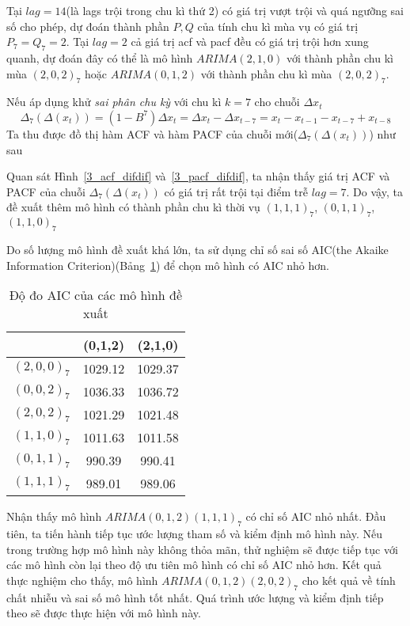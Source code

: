 Tại $lag =14$(là lags trội trong chu kì thứ 2) có giá trị vượt trội và quá ngưỡng sai số cho phép, dự đoán thành phần $P, Q$ của tính chu kì mùa vụ có giá trị  $P_7=Q_7=2$. Tại $lag = 2$ cả giá trị acf và pacf đều có giá trị trội hơn xung quanh, dự đoán đây có thể là mô hình $ARIMA(2,1,0)$ với thành phần chu kì mùa $(2,0,2)_7$ hoặc $ARIMA(0,1,2)$ với thành phần chu kì mùa $(2,0,2)_7$. 

Nếu áp dụng khử \textit{sai phân chu kỳ} với chu kì $k=7$ cho chuỗi $\Delta{x_t}$
\begin{equation}
 \Delta_7(\Delta(x_t)) = (1-B^7)\Delta{x_t} = \Delta{x_t}-\Delta{x_{t-7}} = x_t-x_{t-1} - x_{t-7}+x_{t-8}
\end{equation}
Ta thu được đồ thị hàm ACF và hàm PACF của chuỗi mới($\Delta_7(\Delta(x_t))$) như sau

Quan sát Hình~\ref{3_acf_difdif} và~\ref{3_pacf_difdif}, ta nhận thấy giá trị ACF và PACF của chuỗi $\Delta_7(\Delta(x_t))$ có giá trị rất trội tại điểm trễ $lag = 7$. Do vậy, ta đề xuất thêm mô hình có thành phần chu kì thời vụ $(1,1,1)_7$, $(0,1,1)_7$, $(1,1,0)_7$

Do số lượng mô hình đề xuất khá lớn, ta sử dụng chỉ số sai số AIC(the Akaike Information Criterion)(Bảng~\ref{aic}) để chọn mô hình có AIC nhỏ hơn.
\begin{table}[htbp]
  \centering
  \caption{Độ đo AIC của các mô hình đề xuất}
    \begin{tabular}{ccc}
          & \textbf{(0,1,2)} & \textbf{(2,1,0)} \\
\hline
    $(2,0,0)_7$ & 1029.12 & 1029.37 \\
    $(0,0,2)_7$ & 1036.33 & 1036.72 \\
    $(2,0,2)_7$ & 1021.29 & 1021.48 \\
    $(1,1,0)_7$ & 1011.63 & 1011.58 \\
    $(0,1,1)_7$ & 990.39 & 990.41 \\
    $(1,1,1)_7$ & 989.01 & 989.06 \\
    \end{tabular}%
  \label{aic}%
\end{table}%

Nhận thấy mô hình $ARIMA (0,1,2)(1,1,1)_7$ có chỉ số AIC nhỏ nhất. Đầu tiên, ta tiến hành tiếp tục ước lượng tham số và kiểm định mô hình này. Nếu trong trường hợp mô hình này không thỏa mãn, thử nghiệm sẽ được tiếp tục với các mô hình còn lại theo độ ưu tiên mô hình có chỉ số AIC nhỏ hơn. Kết quả thực nghiệm cho thấy, mô hình $ARIMA (0,1,2)(2,0,2)_7$ cho kết quả về tính chất nhiễu và sai số mô hình tốt nhất. Quá trình ước lượng và kiểm định tiếp theo sẽ được thực hiện với mô hình này.

